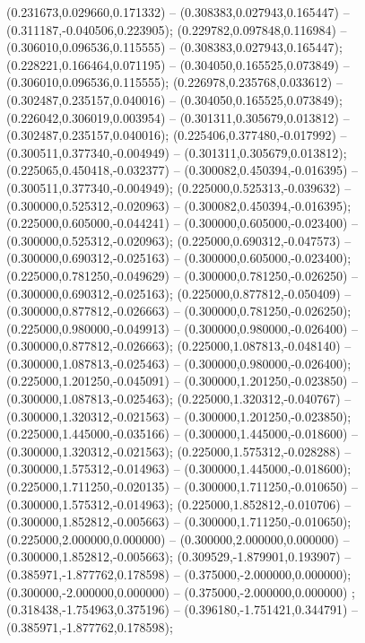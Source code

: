  (0.231673,0.029660,0.171332) -- (0.308383,0.027943,0.165447) -- (0.311187,-0.040506,0.223905);
 (0.229782,0.097848,0.116984) -- (0.306010,0.096536,0.115555) -- (0.308383,0.027943,0.165447);
 (0.228221,0.166464,0.071195) -- (0.304050,0.165525,0.073849) -- (0.306010,0.096536,0.115555);
 (0.226978,0.235768,0.033612) -- (0.302487,0.235157,0.040016) -- (0.304050,0.165525,0.073849);
 (0.226042,0.306019,0.003954) -- (0.301311,0.305679,0.013812) -- (0.302487,0.235157,0.040016);
 (0.225406,0.377480,-0.017992) -- (0.300511,0.377340,-0.004949) -- (0.301311,0.305679,0.013812);
 (0.225065,0.450418,-0.032377) -- (0.300082,0.450394,-0.016395) -- (0.300511,0.377340,-0.004949);
 (0.225000,0.525313,-0.039632) -- (0.300000,0.525312,-0.020963) -- (0.300082,0.450394,-0.016395);
 (0.225000,0.605000,-0.044241) -- (0.300000,0.605000,-0.023400) -- (0.300000,0.525312,-0.020963);
 (0.225000,0.690312,-0.047573) -- (0.300000,0.690312,-0.025163) -- (0.300000,0.605000,-0.023400);
 (0.225000,0.781250,-0.049629) -- (0.300000,0.781250,-0.026250) -- (0.300000,0.690312,-0.025163);
 (0.225000,0.877812,-0.050409) -- (0.300000,0.877812,-0.026663) -- (0.300000,0.781250,-0.026250);
 (0.225000,0.980000,-0.049913) -- (0.300000,0.980000,-0.026400) -- (0.300000,0.877812,-0.026663);
 (0.225000,1.087813,-0.048140) -- (0.300000,1.087813,-0.025463) -- (0.300000,0.980000,-0.026400);
 (0.225000,1.201250,-0.045091) -- (0.300000,1.201250,-0.023850) -- (0.300000,1.087813,-0.025463);
 (0.225000,1.320312,-0.040767) -- (0.300000,1.320312,-0.021563) -- (0.300000,1.201250,-0.023850);
 (0.225000,1.445000,-0.035166) -- (0.300000,1.445000,-0.018600) -- (0.300000,1.320312,-0.021563);
 (0.225000,1.575312,-0.028288) -- (0.300000,1.575312,-0.014963) -- (0.300000,1.445000,-0.018600);
 (0.225000,1.711250,-0.020135) -- (0.300000,1.711250,-0.010650) -- (0.300000,1.575312,-0.014963);
 (0.225000,1.852812,-0.010706) -- (0.300000,1.852812,-0.005663) -- (0.300000,1.711250,-0.010650);
 (0.225000,2.000000,0.000000) -- (0.300000,2.000000,0.000000) -- (0.300000,1.852812,-0.005663);
 (0.309529,-1.879901,0.193907) -- (0.385971,-1.877762,0.178598) -- (0.375000,-2.000000,0.000000);
 (0.300000,-2.000000,0.000000) -- (0.375000,-2.000000,0.000000) ;
 (0.318438,-1.754963,0.375196) -- (0.396180,-1.751421,0.344791) -- (0.385971,-1.877762,0.178598);
